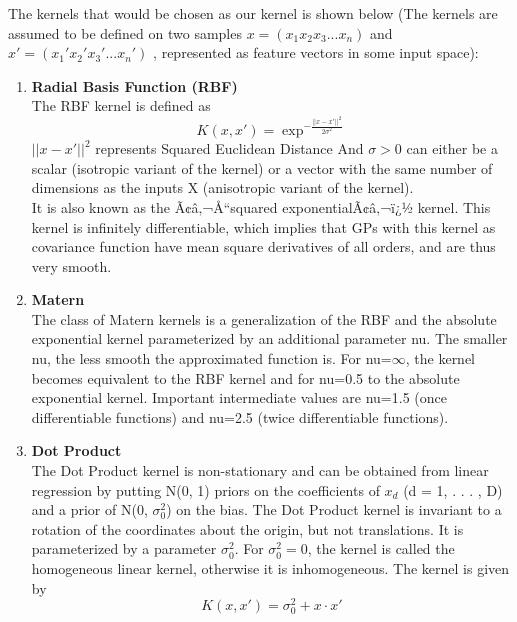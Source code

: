 \documentclass{article}
\begin{document}
	The kernels that would be chosen as our kernel is shown below 
	(The kernels are assumed to be defined on two samples \( x = ( x_{1} x_{2} x_{3} ... x_{n} ) \) and 
	\( x' = ( {x_{1}}' {x_{2}}' {x_{3}}' ... {x_{n}}')\) ,  
	represented as feature vectors in some input space):\\
	\begin{enumerate}
		\item \textbf{Radial Basis Function (RBF)}\\
		The RBF kernel is defined as 
		\begin{equation}\label{eq:kernel_rbf}
			K(x,x') = \exp^{-\frac{||x-x'||^{2}}{2\sigma^{2}}}
		\end{equation}
		\(||x-x'||^{2}\) represents Squared Euclidean Distance 
		And \( \sigma > 0 \) can either be a scalar (isotropic variant of the kernel) or a vector with the same number of dimensions 
		as the inputs X (anisotropic variant of the kernel). \\
		It is also known as the Ã¢â‚¬Å“squared exponentialÃ¢â‚¬ï¿½ kernel. This kernel is infinitely differentiable, 
		which implies that GPs with this kernel as covariance function have mean square derivatives of all orders, 
		and are thus very smooth.\\
		
		\item \textbf{Matern}\\
		The class of Matern kernels is a generalization of the RBF and the absolute exponential kernel parameterized 
		by an additional parameter nu. The smaller nu, the less smooth the approximated function is. For nu=\(\infty\), 
		the kernel becomes equivalent to the RBF kernel and for nu=0.5 to the absolute exponential kernel. 
		Important intermediate values are nu=1.5 (once differentiable functions) and nu=2.5 (twice differentiable functions).\\

		\item \textbf{Dot Product}\\
		The Dot Product kernel is non-stationary and can be obtained from linear regression by putting N(0, 1) priors on the coefficients 
		of \(x_{d}\) (d = 1, . . . , D) and a prior of N(0, \(\sigma_{0}^{2}\)) on the bias. 
		The Dot Product kernel is invariant to a rotation of the coordinates about the origin, but not translations. 
		It is parameterized by a parameter \(\sigma_{0}^{2}\). For \(\sigma_{0}^{2} = 0\), 
		the kernel is called the homogeneous linear kernel, otherwise it is inhomogeneous. The kernel is given by
		\begin{equation}\label{eq:kernel_dp}
			K(x,x') = \sigma_{0}^{2} + x \cdot x'  
		\end{equation}
		\\


\end{enumerate}
\end{document}
